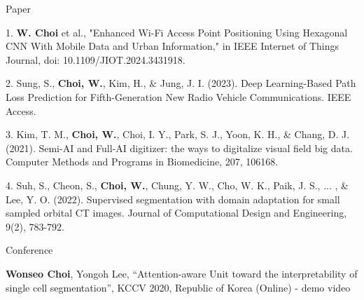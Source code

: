 \documentclass[
	11pt, %
]{resume} %
\begin{document}
\begin{rSection}{Paper}

	1. \textbf{W. Choi} et al., "Enhanced Wi-Fi Access Point Positioning Using Hexagonal CNN With Mobile Data and Urban Information," in IEEE Internet of Things Journal, doi: 10.1109/JIOT.2024.3431918.

	2. Sung, S., \textbf{Choi, W.}, Kim, H., \& Jung, J. I. (2023). Deep Learning-Based Path Loss Prediction for Fifth-Generation New Radio Vehicle Communications. IEEE Access.
	
	3. Kim, T. M., \textbf{Choi, W.}, Choi, I. Y., Park, S. J., Yoon, K. H., \& Chang, D. J. (2021). Semi-AI and Full-AI digitizer: the ways to digitalize visual field big data. Computer Methods and Programs in Biomedicine, 207, 106168.

	4. Suh, S., Cheon, S., \textbf{Choi, W.}, Chung, Y. W., Cho, W. K., Paik, J. S., ... , \& Lee, Y. O. (2022). Supervised segmentation with domain adaptation for small sampled orbital CT images. Journal of Computational Design and Engineering, 9(2), 783-792.


\end{rSection}

\begin{rSection}{Conference}
	
	\textbf{Wonseo Choi}, Yongoh Lee, “Attention-aware Unit toward the interpretability of single cell segmentation”, KCCV 2020, Republic of Korea (Online) - demo video

\end{rSection}

	


\end{document}
